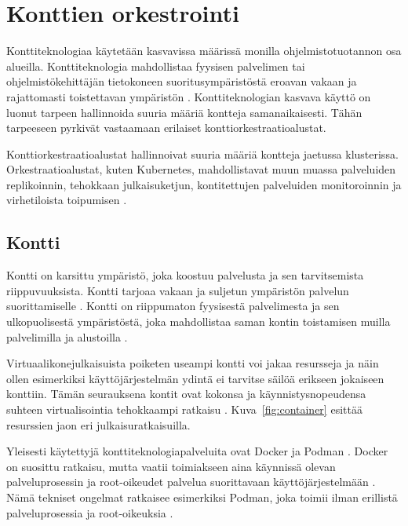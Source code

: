 \chapter{Konttien orkestrointi\label{orchestration}}

Konttiteknologiaa käytetään kasvavissa määrissä monilla ohjelmistotuotannon osa alueilla.
Konttiteknologia mahdollistaa fyysisen palvelimen tai ohjelmistökehittäjän tietokoneen suoritusympäristöstä eroavan vakaan ja rajattomasti toistettavan ympäristön \cite{Watada19}.
Konttiteknologian kasvava käyttö on luonut tarpeen hallinnoida suuria määriä kontteja samanaikaisesti.
Tähän tarpeeseen pyrkivät vastaamaan erilaiset konttiorkestraatioalustat.

Konttiorkestraatioalustat hallinnoivat suuria määriä kontteja jaetussa klusterissa.
Orkestraatioalustat, kuten Kubernetes, mahdollistavat muun muassa palveluiden replikoinnin, tehokkaan julkaisuketjun, kontitettujen palveluiden monitoroinnin ja virhetiloista toipumisen \cite{Khan17}.

\section{Kontti}

Kontti on karsittu ympäristö, joka koostuu palvelusta ja sen tarvitsemista riippuvuuksista.
Kontti tarjoaa vakaan ja suljetun ympäristön palvelun suorittamiselle \cite{Watada19}.
Kontti on riippumaton fyysisestä palvelimesta ja sen ulkopuolisestä ympäristöstä, joka mahdollistaa saman kontin toistamisen muilla palvelimilla ja alustoilla \cite{Kang16}.

Virtuaalikonejulkaisuista poiketen useampi kontti voi jakaa resursseja ja näin ollen esimerkiksi käyttöjärjestelmän ydintä ei tarvitse säilöä erikseen jokaiseen konttiin.
Tämän seurauksena kontit ovat kokonsa ja käynnistysnopeudensa suhteen virtualisointia tehokkaampi ratkaisu \cite{Dua14}.
Kuva~\ref{fig:container} esittää resurssien jaon eri julkaisuratkaisuilla.

Yleisesti käytettyjä konttiteknologiapalveluita ovat Docker ja Podman \cite{Abraham20, Bernstein14}.
Docker on suosittu ratkaisu, mutta vaatii toimiakseen aina käynnissä olevan palveluprosessin ja root-oikeudet palvelua suorittavaan käyttöjärjestelmään \cite{Abraham20}.
Nämä tekniset ongelmat ratkaisee esimerkiksi Podman, joka toimii ilman erillistä palveluprosessia ja root-oikeuksia \cite{Gantikow20}.

\pagebreak %

